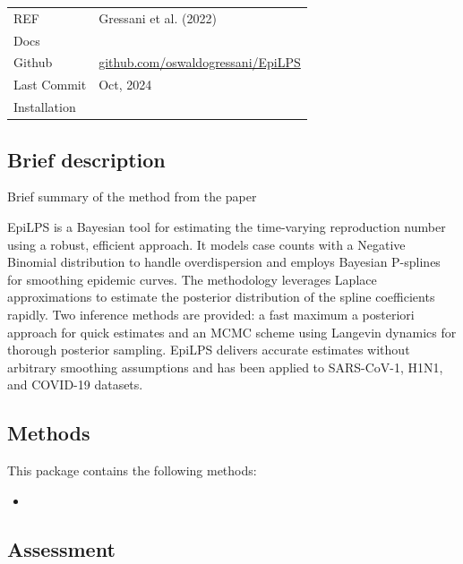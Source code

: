 \documentclass[
  letterpaper,
  DIV=11,
  numbers=noendperiod]{scrreprt}
\providecommand{\tightlist}{%
  \setlength{\itemsep}{0pt}\setlength{\parskip}{0pt}}\usepackage{longtable,booktabs,array}
\begin{document}
\begin{longtable}[]{@{}
  >{\raggedright\arraybackslash}p{}
  >{\raggedright\arraybackslash}p{}@{}}
\toprule\noalign{}
\endhead
\bottomrule\noalign{}
\endlastfoot
REF & Gressani et al. (2022) \\
Docs & \\
Github &
\href{https://github.com/oswaldogressani/EpiLPS}{github.com/oswaldogressani/EpiLPS} \\
Last Commit & Oct, 2024 \\
Installation & \\
\end{longtable}

\subsection*{Brief description}\label{brief-description-8}

Brief summary of the method from the paper

EpiLPS is a Bayesian tool for estimating the time-varying reproduction
number using a robust, efficient approach. It models case counts with a
Negative Binomial distribution to handle overdispersion and employs
Bayesian P-splines for smoothing epidemic curves. The methodology
leverages Laplace approximations to estimate the posterior distribution
of the spline coefficients rapidly. Two inference methods are provided:
a fast maximum a posteriori approach for quick estimates and an MCMC
scheme using Langevin dynamics for thorough posterior sampling. EpiLPS
delivers accurate estimates without arbitrary smoothing assumptions and
has been applied to SARS-CoV-1, H1N1, and COVID-19 datasets.

\subsection*{Methods}\label{methods-7}

This package contains the following methods:

\begin{itemize}
\tightlist
\item
\end{itemize}

\subsection*{Assessment}\label{assessment-7}
\end{document}
